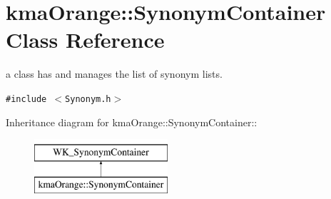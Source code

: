 \hypertarget{classkmaOrange_1_1SynonymContainer}{
\section{kmaOrange::SynonymContainer Class Reference}
\label{classkmaOrange_1_1SynonymContainer}
}
a class has and manages the list of synonym lists.  


{\tt \#include $<$Synonym.h$>$}

Inheritance diagram for kmaOrange::SynonymContainer::\begin{figure}[H]
\begin{center}
\leavevmode
\includegraphics[height=2cm]{classkmaOrange_1_1SynonymContainer}
\end{center}
\end{figure}

